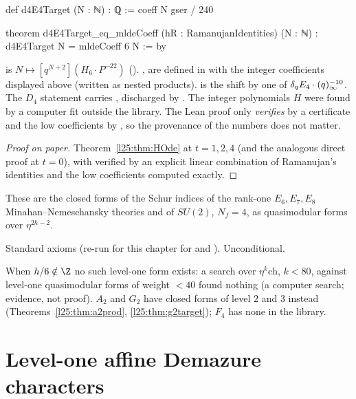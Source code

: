 \begin{leancode}
def d4E4Target (N : ℕ) : ℚ := coeff N gser / 240

theorem d4E4Target_eq_mldeCoeff (hR : RamanujanIdentities) (N : ℕ) :
    d4E4Target N = mldeCoeff 6 N := by
\end{leancode}
\begin{dictionary}
 is $N\mapsto[q^{N+2}](H_6\cdot P^{-22})$ (). ,  are defined in
 with the integer coefficients displayed above (written as nested products).
 is the shift by one of $\delta_q E_4\cdot(q)_\infty^{-10}$. The $D_4$ statement carries , discharged by
. The integer polynomials $H$ were found by a computer fit outside the library. The Lean proof
only \emph{verifies}  by a certificate and the low coefficients by , so the provenance of the
numbers does not matter.
\end{dictionary}
\begin{proof}[Proof on paper]
Theorem~\ref{l25:thm:HOde} at $t=1,2,4$ (and the analogous direct proof at $t=0$), with  verified by an
explicit linear combination of Ramanujan's identities and the low coefficients computed exactly.
\end{proof}
\begin{physics}
These are the closed forms of the Schur indices of the rank-one $E_6,E_7,E_8$ Minahan--Nemeschansky theories and of
$SU(2)$, $N_f=4$, as quasimodular forms over $\eta^{2h-2}$.
\end{physics}
\begin{status}
Standard axioms (re-run for this chapter for  and ).
Unconditional.
\end{status}

\begin{remark}
When $h/6\notin\Z$ no such level-one form exists: a search over $\eta^k\mathrm{ch}$, $k<80$, against level-one
quasimodular forms of weight $<40$ found nothing (a computer search; evidence, not proof). $A_2$ and $G_2$ have closed forms of
level $2$ and $3$ instead (Theorems~\ref{l25:thm:a2prod}, \ref{l25:thm:g2target}); $F_4$ has none in the library.
\end{remark}

\section{Level-one affine Demazure characters}\label{l25:sec:demazure}

